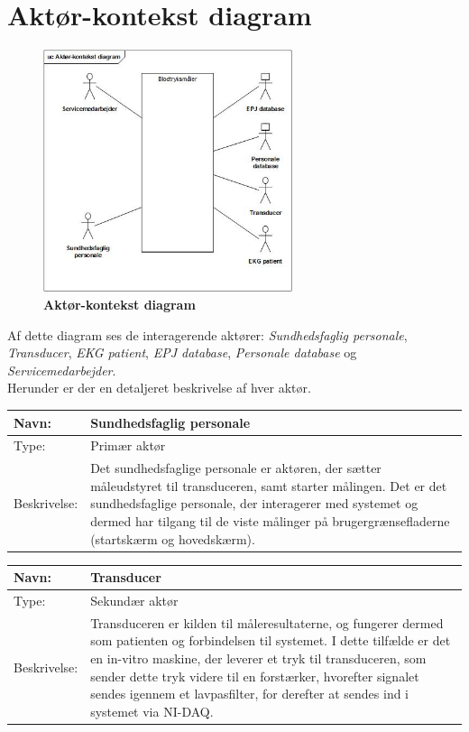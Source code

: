 \section{Aktør-kontekst diagram}
\begin{figure}[h!]
\includegraphics[width =0.65\textwidth , center]{billeder/Aktorkontekst.jpg}
\caption{\textbf{Aktør-kontekst diagram}}
\end{figure}
Af dette diagram ses de interagerende aktører: \textit{Sundhedsfaglig personale}, \textit{Transducer}, \textit{EKG patient}, \textit{EPJ database}, \textit{Personale database} og \textit{Servicemedarbejder}.\\ Herunder er der en detaljeret beskrivelse af hver aktør.
\begin{table}[h!]
\begin{tabular}{| >{\raggedright\arraybackslash}p{3cm} | >{\raggedright\arraybackslash}p{12cm} |}
   \hline
   Navn: & Sundhedsfaglig personale\\ \hline
   Type: & Primær aktør \\ \hline
   Beskrivelse: & Det sundhedsfaglige personale er aktøren, der sætter måleudstyret til transduceren, samt starter målingen. Det er det sundhedsfaglige personale, der interagerer med systemet og dermed har tilgang til de viste målinger på brugergrænsefladerne (startskærm og hovedskærm).\\ \hline
\end{tabular}
\end{table}
\begin{table}[h!]
\begin{tabular}{| >{\raggedright\arraybackslash}p{3cm} | >{\raggedright\arraybackslash}p{12cm} |}
   \hline
   Navn: & Transducer\\ \hline
   Type: & Sekundær aktør \\ \hline
   Beskrivelse: & Transduceren er kilden til måleresultaterne, og fungerer dermed som patienten og forbindelsen til systemet. I dette tilfælde er det en in-vitro maskine, der leverer et tryk til transduceren, som sender dette tryk videre til en forstærker, hvorefter signalet sendes igennem et lavpasfilter, for derefter at sendes ind i systemet via NI-DAQ.\\ \hline
\end{tabular}
\end{table}
